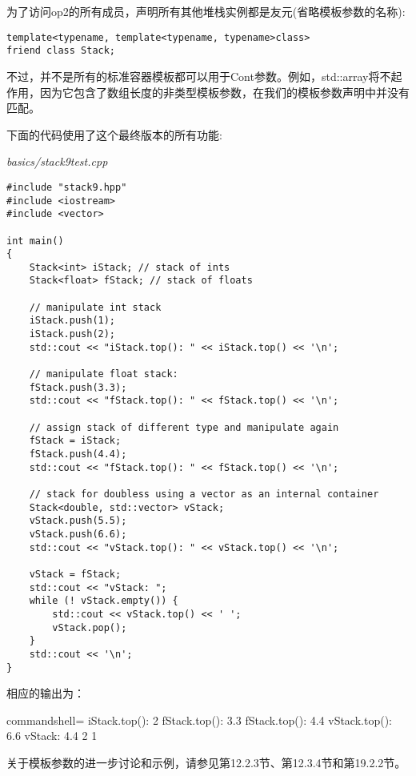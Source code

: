 为了访问op2的所有成员，声明所有其他堆栈实例都是友元(省略模板参数的名称):

\begin{lstlisting}[style=styleCXX]
template<typename, template<typename, typename>class>
friend class Stack;
\end{lstlisting}

不过，并不是所有的标准容器模板都可以用于Cont参数。例如，std::array将不起作用，因为它包含了数组长度的非类型模板参数，在我们的模板参数声明中并没有匹配。

下面的代码使用了这个最终版本的所有功能:

\noindent
\textit{basics/stack9test.cpp}
\begin{lstlisting}[style=styleCXX]
#include "stack9.hpp"
#include <iostream>
#include <vector>

int main()
{
	Stack<int> iStack; // stack of ints
	Stack<float> fStack; // stack of floats
	
	// manipulate int stack
	iStack.push(1);
	iStack.push(2);
	std::cout << "iStack.top(): " << iStack.top() << '\n';
	
	// manipulate float stack:
	fStack.push(3.3);
	std::cout << "fStack.top(): " << fStack.top() << '\n';
	
	// assign stack of different type and manipulate again
	fStack = iStack;
	fStack.push(4.4);
	std::cout << "fStack.top(): " << fStack.top() << '\n';
	
	// stack for doubless using a vector as an internal container
	Stack<double, std::vector> vStack;
	vStack.push(5.5);
	vStack.push(6.6);
	std::cout << "vStack.top(): " << vStack.top() << '\n';
	
	vStack = fStack;
	std::cout << "vStack: ";
	while (! vStack.empty()) {
		std::cout << vStack.top() << ' ';
		vStack.pop();
	}
	std::cout << '\n';
}
\end{lstlisting}

相应的输出为：

\begin{tcblisting}{commandshell={}}
iStack.top(): 2
fStack.top(): 3.3
fStack.top(): 4.4
vStack.top(): 6.6
vStack: 4.4 2 1
\end{tcblisting}

关于模板参数的进一步讨论和示例，请参见第12.2.3节、第12.3.4节和第19.2.2节。





















